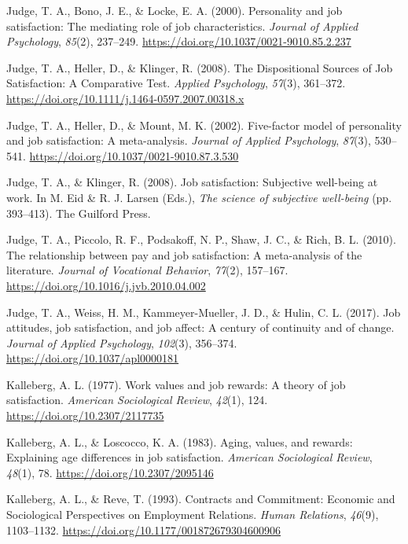 \documentclass[
]{interact}
\newlength{\cslhangindent}
\newenvironment{CSLReferences}[2] %
 {\begin{list}{}{%
  \setlength{\itemindent}{0pt}
  \setlength{\leftmargin}{0pt}
  \setlength{\parsep}{0pt}
  \ifodd #1
   \setlength{\leftmargin}{\cslhangindent}
   \setlength{\itemindent}{-1\cslhangindent}
  \fi
  \setlength{\itemsep}{#2\baselineskip}}}
 {\end{list}}
\begin{document}
\begin{CSLReferences}{1}{0}
Judge, T. A., Bono, J. E., \& Locke, E. A. (2000). Personality and job
satisfaction: The mediating role of job characteristics. \emph{Journal
of Applied Psychology}, \emph{85}(2), 237--249.
\url{https://doi.org/10.1037/0021-9010.85.2.237}

Judge, T. A., Heller, D., \& Klinger, R. (2008). The Dispositional
Sources of Job Satisfaction: A Comparative Test. \emph{Applied
Psychology}, \emph{57}(3), 361--372.
\url{https://doi.org/10.1111/j.1464-0597.2007.00318.x}

Judge, T. A., Heller, D., \& Mount, M. K. (2002). Five-factor model of
personality and job satisfaction: A meta-analysis. \emph{Journal of
Applied Psychology}, \emph{87}(3), 530--541.
\url{https://doi.org/10.1037/0021-9010.87.3.530}

Judge, T. A., \& Klinger, R. (2008). Job satisfaction: Subjective
well-being at work. In M. Eid \& R. J. Larsen (Eds.), \emph{The science
of subjective well-being} (pp. 393--413). The Guilford Press.

Judge, T. A., Piccolo, R. F., Podsakoff, N. P., Shaw, J. C., \& Rich, B.
L. (2010). The relationship between pay and job satisfaction: A
meta-analysis of the literature. \emph{Journal of Vocational Behavior},
\emph{77}(2), 157--167. \url{https://doi.org/10.1016/j.jvb.2010.04.002}

Judge, T. A., Weiss, H. M., Kammeyer-Mueller, J. D., \& Hulin, C. L.
(2017). Job attitudes, job satisfaction, and job affect: A century of
continuity and of change. \emph{Journal of Applied Psychology},
\emph{102}(3), 356--374. \url{https://doi.org/10.1037/apl0000181}

Kalleberg, A. L. (1977). Work values and job rewards: A theory of job
satisfaction. \emph{American Sociological Review}, \emph{42}(1), 124.
\url{https://doi.org/10.2307/2117735}

Kalleberg, A. L., \& Loscocco, K. A. (1983). Aging, values, and rewards:
Explaining age differences in job satisfaction. \emph{American
Sociological Review}, \emph{48}(1), 78.
\url{https://doi.org/10.2307/2095146}

Kalleberg, A. L., \& Reve, T. (1993). Contracts and Commitment: Economic
and Sociological Perspectives on Employment Relations. \emph{Human
Relations}, \emph{46}(9), 1103--1132.
\url{https://doi.org/10.1177/001872679304600906}


\end{CSLReferences}
\end{document}
